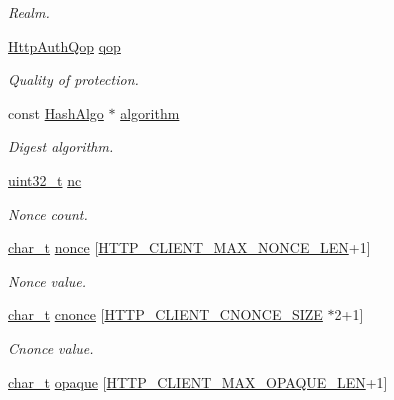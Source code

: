 \begin{DoxyCompactItemize}
\begin{DoxyCompactList}\small\item\em Realm. \end{DoxyCompactList}\item 
\hyperlink{http__common_8h_add2473701f02b0e633970b91bebf92b0}{Http\+Auth\+Qop} \hyperlink{structHttpClientAuthParams_a686fa3d08f2233ab049f6c1fb3a88a76}{qop}
\begin{DoxyCompactList}\small\item\em Quality of protection. \end{DoxyCompactList}\item 
const \hyperlink{structHashAlgo}{Hash\+Algo} $\ast$ \hyperlink{structHttpClientAuthParams_a5fd751d46c8648505a9489c7aa62e655}{algorithm}
\begin{DoxyCompactList}\small\item\em Digest algorithm. \end{DoxyCompactList}\item 
\hyperlink{stdint_8h_a435d1572bf3f880d55459d9805097f62}{uint32\+\_\+t} \hyperlink{structHttpClientAuthParams_af8657995b5e9910a6e205158eab5ada7}{nc}
\begin{DoxyCompactList}\small\item\em Nonce count. \end{DoxyCompactList}\item 
\hyperlink{compiler__port_8h_a40bb5262bf908c328fbcfbe5d29d0201}{char\+\_\+t} \hyperlink{structHttpClientAuthParams_aa5082a3e2626e38e3a6834bbec7299ec}{nonce} \mbox{[}\hyperlink{http__client_8h_aca4c4b3a57b921be4b03a17e1640bebe}{H\+T\+T\+P\+\_\+\+C\+L\+I\+E\+N\+T\+\_\+\+M\+A\+X\+\_\+\+N\+O\+N\+C\+E\+\_\+\+L\+EN}+1\mbox{]}
\begin{DoxyCompactList}\small\item\em Nonce value. \end{DoxyCompactList}\item 
\hyperlink{compiler__port_8h_a40bb5262bf908c328fbcfbe5d29d0201}{char\+\_\+t} \hyperlink{structHttpClientAuthParams_aa1989def27a73aedd87034244415fbf5}{cnonce} \mbox{[}\hyperlink{http__client_8h_aa612d956996c93caa4ccccfef03fc9eb}{H\+T\+T\+P\+\_\+\+C\+L\+I\+E\+N\+T\+\_\+\+C\+N\+O\+N\+C\+E\+\_\+\+S\+I\+ZE} $\ast$2+1\mbox{]}
\begin{DoxyCompactList}\small\item\em Cnonce value. \end{DoxyCompactList}\item 
\hyperlink{compiler__port_8h_a40bb5262bf908c328fbcfbe5d29d0201}{char\+\_\+t} \hyperlink{structHttpClientAuthParams_ab73141887f9df99f4269f26756b1da4b}{opaque} \mbox{[}\hyperlink{http__client_8h_a4252661d7fd08be7eec40656551e274f}{H\+T\+T\+P\+\_\+\+C\+L\+I\+E\+N\+T\+\_\+\+M\+A\+X\+\_\+\+O\+P\+A\+Q\+U\+E\+\_\+\+L\+EN}+1\mbox{]}

\end{DoxyCompactItemize}

